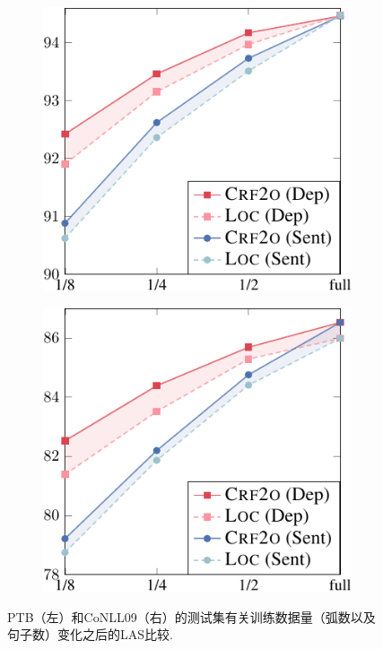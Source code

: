 \begin{figure}[tb!]
  \centering
  \begin{subfigure}[b]{0.4\textwidth}
    \centering
    \includegraphics[width=1.\textwidth]{figures/part-gap-ptb.pdf}
  \end{subfigure}
  \begin{subfigure}[b]{0.4\textwidth}
    \centering
    \includegraphics[width=1.\textwidth]{figures/part-gap-conll.pdf}
  \end{subfigure}
  \caption{
    PTB（左）和CoNLL09（右）的测试集有关训练数据量（弧数以及句子数）变化之后的LAS比较.
  }
  \label{fig:part-gap}
\end{figure}

